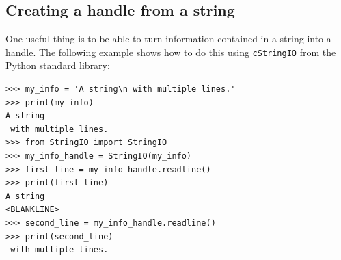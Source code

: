 \documentclass{report}
\begin{document}
\subsection{Creating a handle from a string}

One useful thing is to be able to turn information contained in a
string into a handle. The following example shows how to do this using
\verb|cStringIO| from the Python standard library:

\begin{verbatim}
>>> my_info = 'A string\n with multiple lines.'
>>> print(my_info)
A string
 with multiple lines.
>>> from StringIO import StringIO
>>> my_info_handle = StringIO(my_info)
>>> first_line = my_info_handle.readline()
>>> print(first_line)
A string
<BLANKLINE>
>>> second_line = my_info_handle.readline()
>>> print(second_line)
 with multiple lines.
\end{verbatim}
\end{document}

